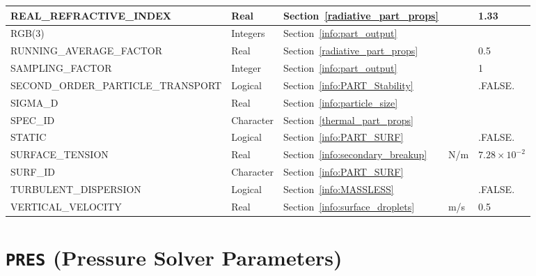 \documentclass[11pt]{book}
\begin{document}
\begin{longtable}{@{\extracolsep{\fill}}|l|l|l|l|l|}
{\ct REAL\_REFRACTIVE\_INDEX}            & Real            & Section~\ref{radiative_part_props}      &           & 1.33          \\ \hline
{\ct RGB(3)}                             & Integers        & Section~\ref{info:part_output}          &           &               \\ \hline
{\ct RUNNING\_AVERAGE\_FACTOR}           & Real            & Section~\ref{radiative_part_props}      &           & 0.5           \\ \hline
{\ct SAMPLING\_FACTOR}                   & Integer         & Section~\ref{info:part_output}          &           & 1             \\ \hline
{\ct SECOND\_ORDER\_PARTICLE\_TRANSPORT} & Logical         & Section~\ref{info:PART_Stability}       &           & {\ct .FALSE.} \\ \hline
{\ct SIGMA\_D}                           & Real            & Section~\ref{info:particle_size}        &           &               \\ \hline
{\ct SPEC\_ID}                           & Character       & Section~\ref{thermal_part_props}        &           &               \\ \hline
{\ct STATIC}                             & Logical         & Section~\ref{info:PART_SURF}            &           & {\ct .FALSE.} \\ \hline
{\ct SURFACE\_TENSION}                   & Real            & Section~\ref{info:secondary_breakup}    & N/m       & $7.28 \times 10^{-2}$  \\ \hline
{\ct SURF\_ID}                           & Character       & Section~\ref{info:PART_SURF}            &           &               \\ \hline
{\ct TURBULENT\_DISPERSION}              & Logical         & Section~\ref{info:MASSLESS}             &           & {\ct .FALSE.} \\ \hline
{\ct VERTICAL\_VELOCITY}                 & Real            & Section~\ref{info:surface_droplets}     & m/s       &  0.5          \\ \hline
\end{longtable}

\vspace{\baselineskip}

\section{\texorpdfstring{{\tt PRES}}{PRES} (Pressure Solver Parameters)}
\end{document}
